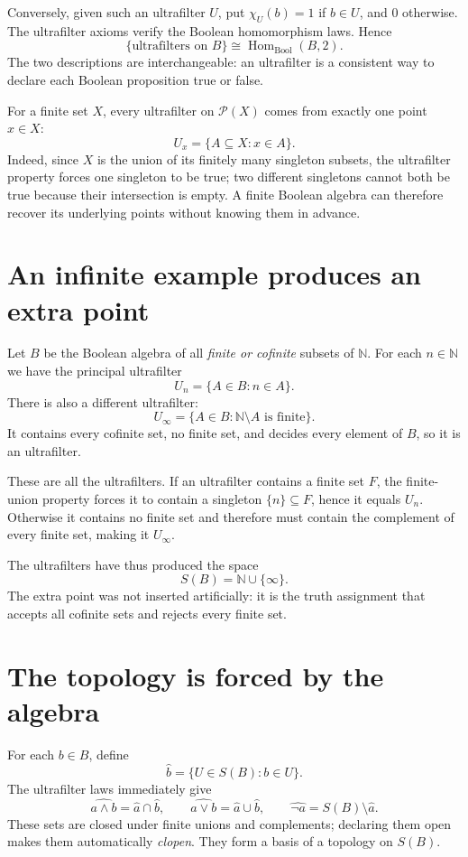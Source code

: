 Conversely, given such an ultrafilter \(U\), put \(\chi_U(b)=1\) if \(b\in U\), and \(0\) otherwise. The ultrafilter axioms verify the Boolean homomorphism laws. Hence
\[
 \boxed{\{\text{ultrafilters on }B\}
 \cong\operatorname{Hom}_{\mathrm{Bool}}(B,2).}
\]
The two descriptions are interchangeable: an ultrafilter is a consistent way to declare each Boolean proposition true or false.

For a finite set \(X\), every ultrafilter on \(\mathcal P(X)\) comes from exactly one point \(x\in X\):
\[
 U_x=\{A\subseteq X:x\in A\}.
\]
Indeed, since \(X\) is the union of its finitely many singleton subsets, the ultrafilter property forces one singleton to be true; two different singletons cannot both be true because their intersection is empty. A finite Boolean algebra can therefore recover its underlying points without knowing them in advance.

\section{An infinite example produces an extra point}

Let \(B\) be the Boolean algebra of all \emph{finite or cofinite} subsets of \(\mathbb N\). For each \(n\in\mathbb N\) we have the principal ultrafilter
\[
 U_n=\{A\in B:n\in A\}.
\]
There is also a different ultrafilter:
\[
 U_\infty=\{A\in B:\mathbb N\setminus A\text{ is finite}\}.
\]
It contains every cofinite set, no finite set, and decides every element of \(B\), so it is an ultrafilter.

These are all the ultrafilters. If an ultrafilter contains a finite set \(F\), the finite-union property forces it to contain a singleton \(\{n\}\subseteq F\), hence it equals \(U_n\). Otherwise it contains no finite set and therefore must contain the complement of every finite set, making it \(U_\infty\).

The ultrafilters have thus produced the space
\[
 S(B)=\mathbb N\cup\{\infty\}.
\]
The extra point was not inserted artificially: it is the truth assignment that accepts all cofinite sets and rejects every finite set.

\section{The topology is forced by the algebra}

For each \(b\in B\), define
\[
 \widehat b=\{U\in S(B):b\in U\}.
\]
The ultrafilter laws immediately give
\[
 \widehat{a\wedge b}=\widehat a\cap\widehat b,\qquad
 \widehat{a\vee b}=\widehat a\cup\widehat b,\qquad
 \widehat{\neg a}=S(B)\setminus\widehat a.
\]
These sets are closed under finite unions and complements; declaring them open makes them automatically \emph{clopen}. They form a basis of a topology on \(S(B)\).

